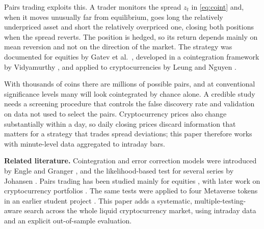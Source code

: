 \documentclass[10pt,a4paper,twocolumn]{article}
\begin{document}
	Pairs trading exploits this. A trader monitors the spread $z_t$ in \eqref{eq:coint} and, when it moves unusually far from equilibrium, goes long the relatively underpriced asset and short the relatively overpriced one, closing both positions when the spread reverts. The position is hedged, so its return depends mainly on mean reversion and not on the direction of the market. The strategy was documented for equities by Gatev et al.\ \cite{gatev2006}, developed in a cointegration framework by Vidyamurthy \cite{vidyamurthy2004}, and applied to cryptocurrencies by Leung and Nguyen \cite{leung2019}.
	
	With thousands of coins there are millions of possible pairs, and at conventional significance levels many will look cointegrated by chance alone. A credible study needs a screening procedure that controls the false discovery rate \cite{benjamini1995} and validation on data not used to select the pairs. Cryptocurrency prices also change substantially within a day, so daily closing prices discard information that matters for a strategy that trades spread deviations; this paper therefore works with minute-level data aggregated to intraday bars.
	
	\textbf{Related literature.} Cointegration and error correction models were introduced by Engle and Granger \cite{engle1987}, and the likelihood-based test for several series by Johansen \cite{johansen1988,johansen1991}. Pairs trading has been studied mainly for equities \cite{gatev2006,vidyamurthy2004}, with later work on cryptocurrency portfolios \cite{leung2019}. The same tests were applied to four Metaverse tokens in an earlier student project \cite{randrianarimanana2024}. This paper adds a systematic, multiple-testing-aware search across the whole liquid cryptocurrency market, using intraday data and an explicit out-of-sample evaluation.
	
\end{document}
